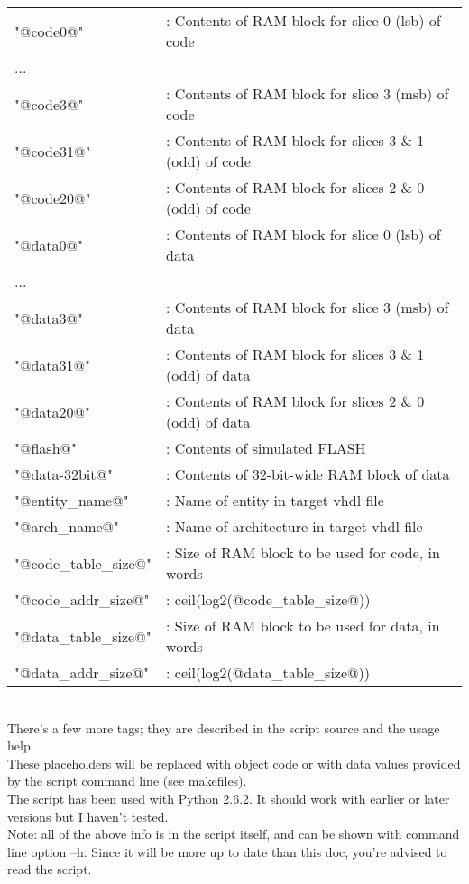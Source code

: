     \begin{tabular}{ l l }
    "@code0@"             & : Contents of RAM block for slice 0 (lsb) of code\\
       ...\\
    "@code3@"             & : Contents of RAM block for slice 3 (msb) of code\\
    "@code31@"            & : Contents of RAM block for slices 3 \& 1 (odd) of code\\
    "@code20@"            & : Contents of RAM block for slices 2 \& 0 (odd) of code\\
    "@data0@"             & : Contents of RAM block for slice 0 (lsb) of data\\
       ...\\
    "@data3@"             & : Contents of RAM block for slice 3 (msb) of data\\
    "@data31@"            & : Contents of RAM block for slices 3 \& 1 (odd) of data\\
    "@data20@"            & : Contents of RAM block for slices 2 \& 0 (odd) of data\\
    "@flash@"             & : Contents of simulated FLASH\\
    "@data-32bit@"        & : Contents of 32-bit-wide RAM block of data\\
    "@entity\_name@"      & : Name of entity in target vhdl file\\
    "@arch\_name@"        & : Name of architecture in target vhdl file\\
    "@code\_table\_size@" & : Size of RAM block to be used for code, in words\\
    "@code\_addr\_size@"  & : ceil(log2(@code\_table\_size@))\\
    "@data\_table\_size@" & : Size of RAM block to be used for data, in words\\
    "@data\_addr\_size@"  & : ceil(log2(@data\_table\_size@))\\
    \end{tabular}\\

    There's a few more tags; they are described in the script source and the 
    usage help.\\
    
    These placeholders will be replaced with object code or with data values
    provided by the script command line (see makefiles).\\

    The script has been used with Python 2.6.2. It should work with earlier
    or later versions but I haven't tested.\\

    Note: all of the above info is in the script itself, and can be shown
    with command line option --h. Since it will be more up to date than this 
    doc, you're advised to read the script.\\  
    
